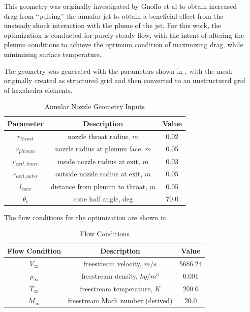 This geometry was originally investigated by Gnoffo et
al\cite{gnoffo2016tapping} to obtain increased drag from ``pulsing'' the annular
jet to obtain a beneficial effect from the unsteady shock interaction with the
plume of the jet.  For this work, the optimization is conducted for purely steady
flow, with the intent of altering the plenum conditions to achieve the optimum
condition of maximizing drag, while minimizing surface temperature.

The geometry was generated with the parameters shown in ,
with the mesh originally created as structured grid and then converted to an
unstructured grid of hexahedra elements.
\begin{table}[h]
  \centering
  \begin{tabular}{c|c|c}
    Parameter & Description & Value \\
    \hline
    $r_{throat}$       &   nozzle throat radius, $m$           & 0.02 \\
    $r_{plenum}$       &   nozzle radius at plenum face, $m$   & 0.05 \\
    $r_{exit,inner}$   &   inside nozzle radius at exit, $m$   & 0.03 \\
    $r_{exit,outer}$   &   outside nozzle radius at exit, $m$  & 0.05 \\
    $l_{conv}$         &   distance from plenum to throat, $m$  & 0.05 \\
    $\theta_c$         &   cone half angle, deg                & 70.0
  \end{tabular}
  \caption{Annular Nozzle Geometry Inputs}
  \label{tab:annular-geom}
\end{table}
The flow conditions for the optimization are shown in 
\begin{table}[!h]
  \centering
  \begin{tabular}{c|c|c}
    Flow Condition & Description & Value \\
    \hline
    $V_{\infty}$    & freestream velocity, $m/s$        & 5686.24 \\
    $\rho_{\infty}$ & freestream density, $kg/m^3$      & 0.001 \\
    $T_{\infty}$    & freestream temperature, $K$       & 200.0 \\
    $M_{\infty}$    & freestream Mach number (derived)  & 20.0
  \end{tabular}
  \caption{Flow Conditions}
  \label{tab:flow-conditions}
\end{table}
